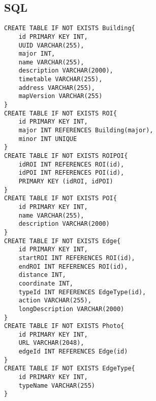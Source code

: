 \documentclass[../SpecificaTecnica.tex]{subfiles}
\begin{document}
	\subsection{SQL}
		\lstset{language=Pascal}
			\begin{lstlisting}
CREATE TABLE IF NOT EXISTS Building{
	id PRIMARY KEY INT,
	UUID VARCHAR(255),
	major INT,
	name VARCHAR(255),
	description VARCHAR(2000),
	timetable VARCHAR(255),
	address VARCHAR(255),
	mapVersion VARCHAR(255)
}
CREATE TABLE IF NOT EXISTS ROI{
	id PRIMARY KEY INT,
	major INT REFERENCES Building(major),
	minor INT UNIQUE
}
CREATE TABLE IF NOT EXISTS ROIPOI{
	idROI INT REFERENCES ROI(id),
	idPOI INT REFERENCES POI(id),
	PRIMARY KEY (idROI, idPOI)
}
CREATE TABLE IF NOT EXISTS POI{
	id PRIMARY KEY INT,
	name VARCHAR(255),
	description VARCHAR(2000)
}
CREATE TABLE IF NOT EXISTS Edge{
	id PRIMARY KEY INT,
	startROI INT REFERENCES ROI(id),
	endROI INT REFERENCES ROI(id),
	distance INT,
	coordinate INT,
	typeId INT REFERENCES EdgeType(id),
	action VARCHAR(255),
	longDescription VARCHAR(2000)
}
CREATE TABLE IF NOT EXISTS Photo{
	id PRIMARY KEY INT,
	URL VARCHAR(2048),
	edgeId INT REFERENCES Edge(id)
}
CREATE TABLE IF NOT EXISTS EdgeType{
	id PRIMARY KEY INT,
	typeName VARCHAR(255)
}
			\end{lstlisting}
\end{document}
